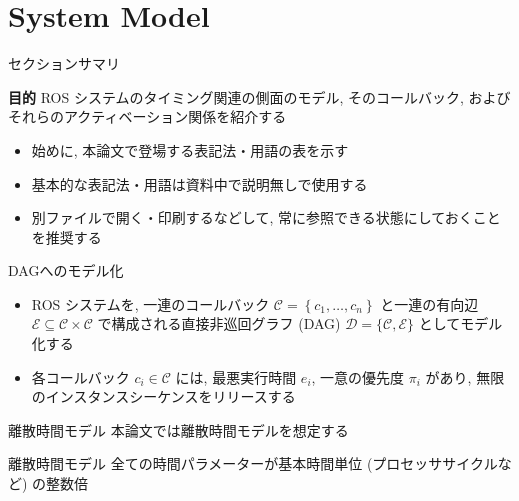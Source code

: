 
\section{System Model}
\label{sec: system model}

\begin{frame}{セクションサマリ}
    \begin{itembox}[l]{\textbf{目的}}
        ROS システムのタイミング関連の側面のモデル, そのコールバック, およびそれらのアクティベーション関係を紹介する
    \end{itembox}
\end{frame}

\begin{frame}{}
    \begin{itemize}
        \item 始めに, 本論文で登場する表記法・用語の表を示す
        \item 基本的な表記法・用語は資料中で説明無しで使用する
        \item 別ファイルで開く・印刷するなどして, 常に参照できる状態にしておくことを推奨する
    \end{itemize}
\end{frame}



\begin{frame}{DAGへのモデル化}
    \begin{itemize}
        \item ROS システムを, 一連のコールバック $\mathcal{C}=\left\{c_{1}, \ldots, c_{n}\right\}$ と一連の有向辺 $\mathcal{E} \subseteq \mathcal{C} \times \mathcal{C}$ で構成される直接非巡回グラフ (DAG) $\mathcal{D}=\{\mathcal{C}, \mathcal{E}\}$ としてモデル化する
        \item 各コールバック $c_{i} \in \mathcal{C}$ には, 最悪実行時間 $e_{i}$, 一意の優先度 $\pi_{i}$ があり, 無限のインスタンスシーケンスをリリースする
    \end{itemize}
\end{frame}

\begin{frame}{離散時間モデル}
    本論文では離散時間モデルを想定する
    \begin{block}{離散時間モデル}
        全ての時間パラメーターが基本時間単位 (プロセッササイクルなど) の整数倍
    \end{block}
\end{frame}


